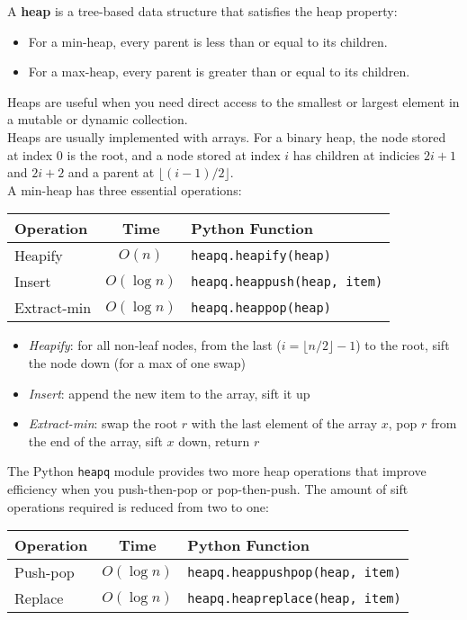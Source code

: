 \documentclass[12pt, titlepage]{article}
\newcommand{\floor}[1]{\lfloor #1 \rfloor}
\begin{document}
A \textbf{heap} is a tree-based data structure that satisfies the heap property:
\begin{itemize}
  \item For a min-heap, every parent is less than or equal to its children.
  \item For a max-heap, every parent is greater than or equal to its children.
\end{itemize}

Heaps are useful when you need direct access to the smallest or largest element in a mutable or dynamic collection. \\

Heaps are usually implemented with arrays. For a binary heap, the node stored at index $0$ is the root, and a node stored at index $i$ has children at indicies $2i + 1$ and $2i + 2$ and a parent at $\floor{(i - 1)/2}$. \\

A min-heap has three essential operations:
\begin{center}
\begin{tabular}{|l|c|l|}
  \hline
  \textbf{Operation} & \textbf{Time} & \textbf{Python Function} \\
  \hline
  Heapify & $O(n)$ & \texttt{heapq.heapify(heap)} \\
  Insert & $O(\log n)$ & \texttt{heapq.heappush(heap, item)} \\
  Extract-min & $O(\log n)$ & \texttt{heapq.heappop(heap)} \\
  \hline
\end{tabular}
\end{center}

\begin{itemize}
  \item \textit{Heapify}: for all non-leaf nodes, from the last ($i = \floor{n/2} - 1$) to the root, sift the node down (for a max of one swap)
  \item \textit{Insert}: append the new item to the array, sift it up
  \item \textit{Extract-min}: swap the root $r$ with the last element of the array $x$, pop $r$ from the end of the array, sift $x$ down, return $r$
\end{itemize}

The Python \texttt{heapq} module provides two more heap operations that improve efficiency when you push-then-pop or pop-then-push. The amount of sift operations required is reduced from two to one:
\begin{center}
\begin{tabular}{|l|c|l|}
  \hline
  \textbf{Operation} & \textbf{Time} & \textbf{Python Function} \\
  \hline
  Push-pop & $O(\log n)$ & \texttt{heapq.heappushpop(heap, item)} \\
  Replace & $O(\log n)$ & \texttt{heapq.heapreplace(heap, item)} \\
  \hline
\end{tabular}
\end{center}
\end{document}
